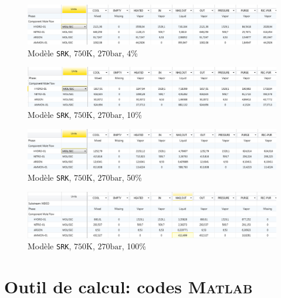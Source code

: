 \begin{figure}[h!]
	\begin{center}
		\includegraphics[scale=0.5]{SRK,750,270,4.png}
	\end{center}
	\caption{Modèle \texttt{SRK}, $750\si{\kelvin}$, $270\si{\bar}$, 4\%}
	\label{fig:SRK,750,270,0.04}
\end{figure}

\begin{figure}[h!]
	\begin{center}
		\includegraphics[scale=0.5]{SRK,750,270,10.png}
	\end{center}
	\caption{Modèle \texttt{SRK}, $750\si{\kelvin}$, $270\si{\bar}$, 10\%}
	\label{fig:SRK,750,270,0.1}
\end{figure}

\begin{figure}[h!]
	\begin{center}
		\includegraphics[scale=0.5]{SRK,750,270,50.png}
	\end{center}
	\caption{Modèle \texttt{SRK}, $750\si{\kelvin}$, $270\si{\bar}$, 50\%}
	\label{fig:SRK,750,270,0.5}
\end{figure}

\begin{figure}[h!]
	\begin{center}
		\includegraphics[scale=0.5]{SRK,750,270,100.png}
	\end{center}
	\caption{Modèle \texttt{SRK}, $750\si{\kelvin}$, $270\si{\bar}$, 100\%}
	\label{fig:SRK,750,270,1}
\end{figure}

\section{Outil de calcul: codes \textsc{Matlab}}


